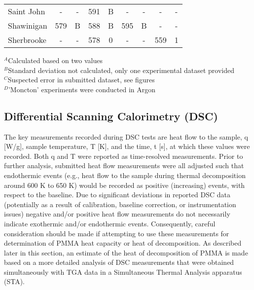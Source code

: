 \documentclass{book}
\begin{document}
\begin{table}[ht]
\begin{center}
\begin{tabular}{|l|cc|cc|cc|cc|}
Saint John              & -           & -               & 591            & B                & -          & -                 & -           & -                     \\
Shawinigan              & 579         & B               & 588            & B                & 595        & B                 & -           & -                     \\
Sherbrooke              & -           & -               & 578            & 0                & -          & -                 & 559         & 1                     \\  \hline
\end{tabular}
\end{center}
$^A$Calculated based on two values \\
$^B$Standard deviation not calculated, only one experimental dataset provided \\
$^C$Suspected error in submitted dataset, see figures \\
$^D$'Moncton' experiments were conducted in Argon
\end{table}



\subsection{Differential Scanning Calorimetry (DSC)}

The key measurements recorded during DSC tests are heat flow to the sample, q [W/g], sample temperature, T [K], and the time, t [s], at which these values were recorded.  Both q and T were reported as time-resolved measurements. Prior to further analysis, submitted heat flow measurements were all adjusted such that endothermic events (e.g., heat flow to the sample during thermal decomposition around 600 K to 650 K) would be recorded as positive (increasing) events, with respect to the baseline. Due to significant deviations in reported DSC data (potentially as a result of calibration, baseline correction, or instrumentation issues) negative and/or positive heat flow measurements do not necessarily indicate exothermic and/or endothermic events. Consequently, careful consideration should be made if attempting to use these measurements for determination of PMMA heat capacity or heat of decomposition. As described later in this section, an estimate of the heat of decomposition of PMMA is made based on a more detailed analysis of DSC measurements that were obtained simultaneously with TGA data in a Simultaneous Thermal Analysis apparatus (STA).
\end{document}
